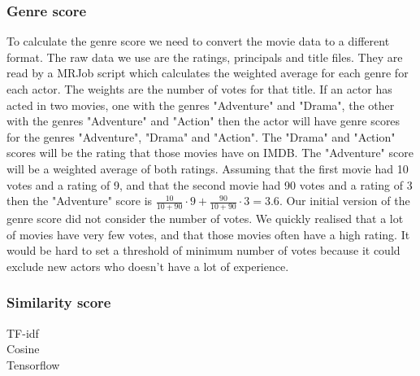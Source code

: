 \subsubsection{Genre score}
To calculate the genre score we need to convert the movie data to a different format. The raw data we use are the ratings, principals and title files. They are read by a MRJob script which calculates the weighted average for each genre for each actor. The weights are the number of votes for that title. If an actor has acted in two movies, one with the genres "Adventure" and "Drama", the other with the genres "Adventure" and "Action" then the actor will have genre scores for the genres "Adventure", "Drama" and "Action". The "Drama" and "Action" scores will be the rating that those movies have on IMDB. The "Adventure" score will be a weighted average of both ratings. Assuming that the first movie had 10 votes and a rating of 9, and that the second movie had 90 votes and a rating of 3 then the "Adventure" score is $\frac{10}{10+90}\cdot9+\frac{90}{10+90}\cdot3=3.6$. Our initial version of the genre score did not consider the number of votes. We quickly realised that a lot of movies have very few votes, and that those movies often have a high rating. It would be hard to set a threshold of minimum number of votes because it could exclude new actors who doesn't have a lot of experience. 

\subsubsection{Similarity score}
TF-idf \\
Cosine \\ 
Tensorflow \\

